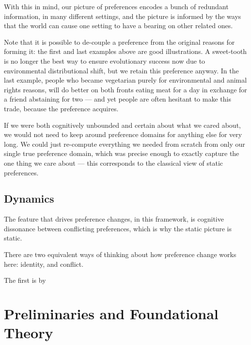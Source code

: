 \documentclass{article}
\theoremstyle{plain}
\theoremstyle{definition}
\theoremstyle{remark}
\begin{document}
	With this in mind, our picture of preferences encodes a bunch of redundant information, in many different settings, and the picture is informed by the ways that the world can cause one setting to have a bearing on other related ones. 
	
	Note that it is possible to de-couple a preference from the original reasons for forming it: the first and last examples above are good illustrations. A sweet-tooth is no longer the best way to ensure evolutionary success now due to environmental distributional shift, but we retain this preference anyway. In the last example, people who became vegetarian purely for environmental and animal rights reasons, will do better on both fronts eating meat for a day in exchange for a friend abstaining for two --- and yet people are often hesitant to make this trade, because the preference acquires.
	
	If we were both cognitively unbounded and certain about what we cared about, we would not need to keep around preference domains for anything else for very long. We could just re-compute everything we needed from scratch from only our single true preference domain, which was precise enough to exactly capture the one thing we care about --- this corresponds to the classical view of static preferences.
	
	
	\subsection{Dynamics}
	The feature that drives preference changes, in this framework, is cognitive dissonance between conflicting preferences, which is why the static picture is static.
	
	There are two equivalent ways of thinking about how preference change works here: identity, and conflict.
	
	The first is by 
	
	\section{Preliminaries and Foundational Theory}
\end{document}
